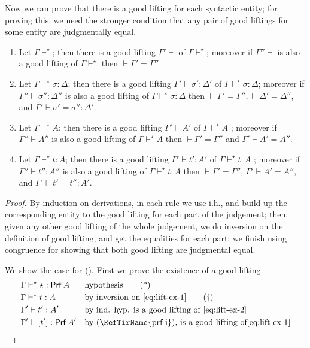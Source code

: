 \documentclass{LMCS}
\theoremstyle{plain}\newtheorem{satz}[thm]{Satz}
\newcommand{\proofLine}[2]{&#1&&\text{#2}}
\newcommand{\boxty}[1]{[#1]}
\newcommand{\boxtm}[1]{[#1]}
\newcommand{\dctx}[1]{#1\vdash}
\newcommand{\dtype}[2]{#1\vdash#2}
\newcommand{\dterm}[3]{#1\vdash#3:#2}
\newcommand{\dsubs}[3]{#1\vdash#3:#2}
\newcommand{\deqctx}[2]{\vdash#1=#2}
\newcommand{\deqtype}[3]{#1\vdash#2=#3}
\newcommand{\deqterm}[4]{#1\vdash#3=#4:#2}
\newcommand{\deqsubs}[4]{#1\vdash #3=#4: #2}
\newcommand{\vdashp}{\vdash^{\oprf}}\newcommand{\sdctx}[1]{#1\vdashp}
\newcommand{\sdtype}[2]{#1\vdashp#2}
\newcommand{\sdterm}[3]{#1\vdashp#3:#2}
\newcommand{\sdsubs}[3]{#1\vdashp#3:#2}
\newcommand{\ruleref}[1]{(\RefTirName{#1})}
\newcommand{\oprf}{\dprf}
\newcommand{\dprf}{\star}
\renewcommand{\boxty}[1]{\mathsf{Prf}\,#1}
\begin{document}
{  \noindent Now we can prove that there is a good lifting for each syntactic 
  entity; for proving this, we need the stronger condition that 
  any pair of good liftings for some entity are judgmentally equal.

  \begin{thm}\label{T:good-lifting}\hfill
    \begin{enumerate}[\em(1)]
    \item Let $\sdctx{\Gamma}$; then there is a good lifting 
      $\dctx{\Gamma'}$ of $\sdctx{\Gamma}$; moreover if
      $\dctx{\Gamma''}$ is also a good lifting of $\sdctx{\Gamma}$
      then $\deqctx{\Gamma'}{\Gamma''}$.
    \item Let $\sdsubs{\Gamma}{\Delta}{\sigma}$; then there is a good
      lifting $\dsubs{\Gamma'}{\Delta'}{\sigma'}$ of
      $\sdsubs{\Gamma}{\Delta}{\sigma}$; moreover if
      $\dsubs{\Gamma''}{\Delta''}{\sigma''}$ is also a good lifting of
      $\sdsubs{\Gamma}{\Delta}{\sigma}$ then $\deqctx{\Gamma'}{\Gamma''}, \deqctx{\Delta'}{\Delta''}$,
      and $\deqsubs{\Gamma'}{\Delta'}{\sigma'}{\sigma''}$.
    \item Let $\sdtype{\Gamma}{A}$; then there is a good lifting
      $\dtype{\Gamma'}{A'}$ of $\sdtype{\Gamma}{A}$ ; moreover if
      $\dtype{\Gamma''}{A''}$ is also a good lifting of
      $\sdtype{\Gamma}{A}$ then $\deqctx{\Gamma'}{\Gamma''}$ and
      $\deqtype{\Gamma'}{A'}{A''}$.
    \item Let $\sdterm{\Gamma}{A}{t}$; then there is a good lifting
      $\dterm{\Gamma'}{A'}{t'}$ of $\sdterm{\Gamma}{A}{t}$ ; moreover
      if $\dterm{\Gamma''}{A''}{t''}$ is also a good lifting of
      $\sdterm{\Gamma}{A}{t}$ then $\deqctx{\Gamma'}{\Gamma''}$,
      $\deqtype{\Gamma'}{A'}{A''}$, and $\deqterm{\Gamma'}{A'}{t'}{t''}$.
    \end{enumerate}
  \end{thm}

  \begin{proof}
    By induction on derivations, in each rule we use i.h., and build
    up the corresponding entity to the good lifting for each part of
    the judgement; then, given any other good lifting of the whole
    judgement, we do inversion on the definition of good lifting, and
    get the equalities for each part; we finish using congruence for
    showing that both good lifting are judgmental equal.

  We show the case for \ruleref{prf-tm}. First we prove the existence of
  a good lifting.
  \begin{align*}
    \proofLine{\sdterm{\Gamma}{\boxty{A}}{\oprf}}{hypothesis}\tag{*}\label{eq:lift-ex-1}\\
    \proofLine{\sdterm{\Gamma}{A}{t}}{by inversion on \eqref{eq:lift-ex-1}}
      \tag{\textdagger}\label{eq:lift-ex-2} \\
    \proofLine{\dterm{\Gamma'}{A'}{t'}}{by ind. hyp. is a good lifting of \eqref{eq:lift-ex-2}} \\
    \proofLine{\dterm{\Gamma'}{\boxty{A'}}{\boxtm{t'}}}{by \ruleref{prf-i}, is a good lifting of\eqref{eq:lift-ex-1}}      
  \end{align*}


\end{proof}}
\end{document}
